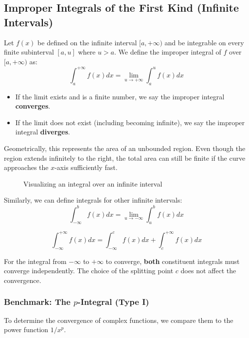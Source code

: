\documentclass[oneside]{book}
\begin{document}
\subsection{Improper Integrals of the First Kind (Infinite Intervals)}

\begin{definition}
Let $f(x)$ be defined on the infinite interval $[a, +\infty)$ and be integrable on every finite subinterval $[a, u]$ where $u > a$. We define the improper integral of $f$ over $[a, +\infty)$ as:
\[
\int_a^{+\infty} f(x) dx = \lim_{u \to +\infty} \int_a^u f(x) dx
\]

\begin{itemize}
    \item If the limit exists and is a finite number, we say the improper integral \textbf{converges}.
    \item If the limit does not exist (including becoming infinite), we say the improper integral \textbf{diverges}.
\end{itemize}
\end{definition}
Geometrically, this represents the area of an unbounded region. Even though the region extends infinitely to the right, the total area can still be finite if the curve approaches the $x$-axis sufficiently fast.
\begin{figure}[htbp]
\centering
{}
\caption{Visualizing an integral over an infinite interval}
\end{figure}

Similarly, we can define integrals for other infinite intervals:
\[
\int_{-\infty}^b f(x) dx = \lim_{u \to -\infty} \int_u^b f(x) dx
\]

\[
\int_{-\infty}^{+\infty} f(x) dx = \int_{-\infty}^c f(x) dx + \int_c^{+\infty} f(x) dx
\]

For the integral from $-\infty$ to $+\infty$ to converge, \textbf{both} constituent integrals must converge independently. The choice of the splitting point $c$ does not affect the convergence.
\subsubsection{Benchmark: The $p$-Integral (Type I)}
To determine the convergence of complex functions, we compare them to the power function $1/x^p$.
\end{document}
